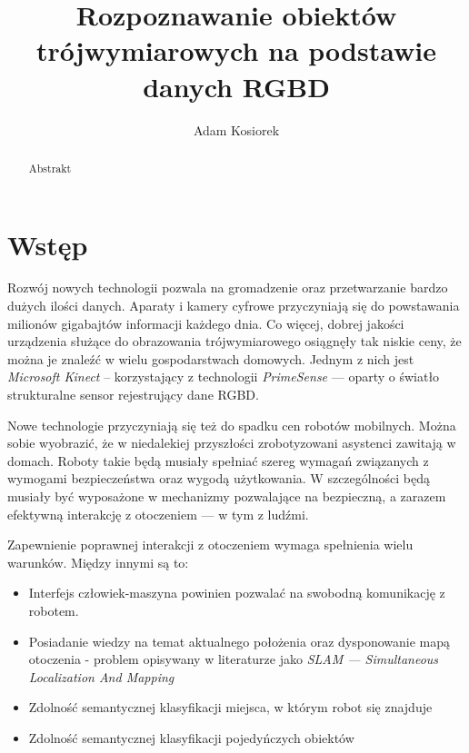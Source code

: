 \documentclass[a4paper,10pt]{article}
\title{Rozpoznawanie obiektów trójwymiarowych na podstawie danych RGBD}
\author{Adam Kosiorek}
\begin{document}
\maketitle

\begin{abstract}

Abstrakt

\end{abstract}

\section{Wstęp}

  Rozwój nowych technologii pozwala na gromadzenie oraz przetwarzanie bardzo dużych ilości danych. Aparaty i kamery cyfrowe przyczyniają się do powstawania milionów gigabajtów informacji każdego dnia. Co więcej, dobrej jakości urządzenia służące do obrazowania trójwymiarowego osiągnęły tak niskie ceny, że można je znaleźć w wielu gospodarstwach domowych. Jednym z nich jest \textit{Microsoft Kinect} -- korzystający z technologii \textit{PrimeSense} --- oparty o światło strukturalne sensor rejestrujący dane RGBD.
  
  Nowe technologie przyczyniają się też do spadku cen robotów mobilnych. Można sobie wyobrazić, że w niedalekiej przyszłości zrobotyzowani asystenci zawitają w domach. Roboty takie będą musiały spełniać szereg wymagań związanych z wymogami bezpieczeństwa oraz wygodą użytkowania. W szczególności będą musiały być wyposażone w mechanizmy pozwalające na bezpieczną, a zarazem efektywną interakcję z otoczeniem --- w tym z ludźmi. 
  
  Zapewnienie poprawnej interakcji z otoczeniem wymaga spełnienia wielu warunków. Między innymi są to: 
  \begin{itemize}
   \item Interfejs człowiek-maszyna powinien pozwalać na swobodną komunikację z robotem.
   \item Posiadanie wiedzy na temat aktualnego położenia oraz dysponowanie mapą otoczenia - problem opisywany w literaturze jako \textit{SLAM --- Simultaneous Localization And Mapping}
   \item Zdolność semantycznej klasyfikacji miejsca, w którym robot się znajduje
   \item Zdolność semantycznej klasyfikacji pojedyńczych obiektów   
  \end{itemize}
  
\end{document}
